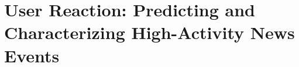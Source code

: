 \chapter{User Reaction: Predicting and Characterizing High-Activity News Events} 
\label{chapter:high-activity}





